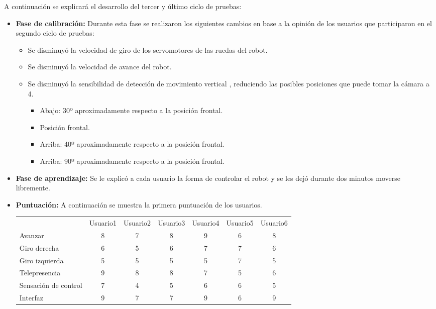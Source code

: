 \documentclass[twoside, 11pt]{epstfg}
\begin{document}
A continuación se explicará el desarrollo del tercer y último ciclo de pruebas:
\begin{itemize}
	\item \textbf{Fase de calibración:} Durante esta fase se realizaron los siguientes cambios en base a la opinión de los usuarios que participaron en el segundo ciclo de pruebas:
	\begin{itemize}
		\item Se disminuyó la velocidad de giro de los servomotores de las ruedas del robot.
		\item Se disminuyó la velocidad de avance del robot.
		\item Se disminuyó la sensibilidad de detección de movimiento vertical , reduciendo las posibles posiciones que puede tomar la cámara a 4.
		\begin{itemize}
			\item Abajo: 30º aproximadamente respecto a la posición frontal.
			\item Posición frontal.
			\item Arriba: 40º aproximadamente respecto a la posición frontal.
			\item Arriba: 90º aproximadamente respecto a la posición frontal.
		\end{itemize}
	\end{itemize}
	\item \textbf{Fase de aprendizaje:} Se le explicó a cada usuario la forma de controlar el robot y se les dejó durante dos minutos moverse libremente.
	\item \textbf{Puntuación: } A continuación se muestra la primera puntuación de los usuarios.
	
\begin{center}

\resizebox{15cm}{!} {
	\begin{tabular}{|g c c c c c c|}
		\hline
		 \\ \hline
		& Usuario1	&Usuario2	&Usuario3	&Usuario4	&Usuario5	&Usuario6 \\
		Avanzar
		 & 8 &7 &8 &9 &6 & 8\\
	Giro derecha
	 & 6 & 5 &6 &7 & 7& 6\\
		Giro izquierda
		 & 5 & 5&5 &5 &7 & 5\\
		Telepresencia
		 & 9 & 8 &8 & 7& 5& 6\\ 
		 Sensación de control
		 & 7 &4 &5 & 6&6 & 5\\
		 		 Interfaz
		 		 & 9 &7 & 7& 9& 6& 9\\
		 \hline
	\end{tabular}
}
\end{center}


\end{itemize}
\end{document}
